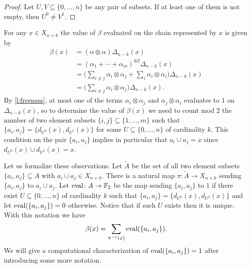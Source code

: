 \begin{proof}
	Let $U, V \subseteq \{0, \dots, n\}$ be any pair of subsets. If at least one of them is not empty, then $U^0 \neq V^1$.
\end{proof}

For any $x \in X_{n+k}$ the value of $\beta$ evaluated on the chain represented by $x$ is given by 
\begin{align*}
\beta(x) & =
(\alpha \otimes \alpha) \Delta_{n-k}(x) \\ & =
(\alpha_1 + \cdots + \alpha_m)^{\otimes 2} \Delta_{n-k}(x) \\ & =
\Big(\sum_{i \neq j} \alpha_i \otimes \alpha_j + \sum_{i} \alpha_i \otimes \alpha_i \Big)
\Delta_{n-k}(x) \\ & =
\Big(\sum_{i \neq j} \alpha_i \otimes \alpha_j\Big)
\Delta_{n-k}(x).
\end{align*}
By \cref{l:freeness}, at most one of the terms $\alpha_i \otimes \alpha_j$ and $\alpha_j \otimes \alpha_i$ evaluates to $1$ on $\Delta_{n-k}(x)$, so to determine the value of $\beta(x)$ we need to count mod 2 the number of two element subsets $\{i,j\} \subseteq \{1,\dots, m\}$ such that $\{a_i, a_j\} = \{d_{U^0}(x), d_{U^1}(x)\}$ for some $U \subseteq \{0, \dots, n\}$ of cardinality $k$.
This condition on the pair $\{a_i, a_j\}$ implies in particular that $a_i \cup a_j = x$ since $d_{U^0}(x) \cup d_{U^1}(x) = x$.

Let us formalize these observations.
Let $\widetilde{A}$ be the set of all two element subsets $\{a_i, a_j\} \subseteq A$ with $a_i \cup a_j \in X_{n+k}$.
There is a natural map $\pi \colon \widetilde{A} \to X_{n+k}$ sending $\{a_i, a_j\}$ to $a_i \cup a_j$.
Let $\operatorname{eval} \colon A \to \mathbb{F}_2$ be the map sending $\{a_i, a_j\}$ to $1$ if there exist $U \subseteq \{0,\dots,n\}$ of cardinality $k$ such that $\{a_i, a_j\} = \{d_{U^0}(x), d_{U^1}(x)\}$ and let $\operatorname{eval}(\{a_i, a_j\}) = 0$ otherwise.
Notice that if such $U$ exists then it is unique.
With this notation we have
\begin{equation*}
\beta(x) = \sum_{\pi^{-1}(x)} \operatorname{eval}(\{a_i, a_j\}).
\end{equation*}
We will give a computational characterization of $\operatorname{eval}(\{a_i, a_j\}) = 1$ after introducing some more notation.

